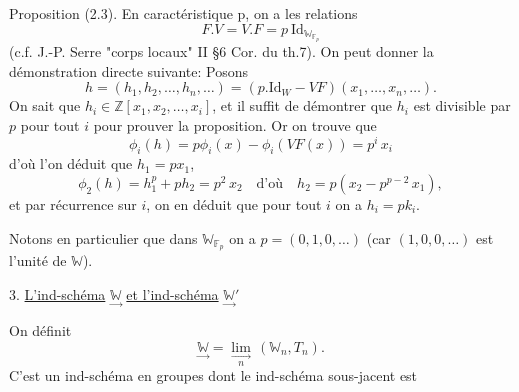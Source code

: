 Proposition (2.3). En caractéristique p, on a les relations
\[ F.V = V.F = p\ \mathrm{Id}_{\mathbb{W}_{\mathbb{F}_p}} \]
(c.f. J.-P. Serre "corps locaux" II §6 Cor. du th.7). On peut
donner la démonstration directe suivante: Posons
\[ h = (h_1,h_2,\ldots,h_n,\ldots) = (p.\mathrm{Id}_W - VF)(x_1,\ldots,x_n,\ldots). \]
On sait que $h_i \in \mathbb{Z}[x_1,x_2,\ldots,x_i]$, et il suffit de démontrer que $h_i$
est divisible par $p$ pour tout $i$ pour prouver la proposition. Or
on trouve que
\[ \phi_i(h) = p\phi_i(x) - \phi_i(VF(x)) = p^i\, x_i \]
d'où l'on déduit que $h_1 = px_1$,
\[ \phi_2(h) = h_1^p + ph_2 = p^2\, x_2 \quad \text{d'où} \quad h_2 = p(x_2-p^{p-2}\, x_1), \]
et par récurrence sur $i$, on en déduit que pour tout $i$ on a $h_i = pk_i$.

Notons en particulier que dans $\mathbb{W}_{\mathbb{F}_p}$ on a $p = (0,1,0,\ldots)$
(car $(1,0,0,\ldots)$ est l'unité de $\mathbb{W}$).

3. \uline{L'ind-schéma} $\underset{\rightarrow}{\mathbb{W}}$ \uline{et l'ind-schéma} $\underset{\rightarrow}{\mathbb{W}}'$

On définit
\[ \underset{\rightarrow}{\mathbb{W}} = \underset{n}{\underset{\rightarrow}{\lim}}\, (\mathbb{W}_n,T_n). \]
C'est un ind-schéma en groupes dont le ind-schéma sous-jacent est

